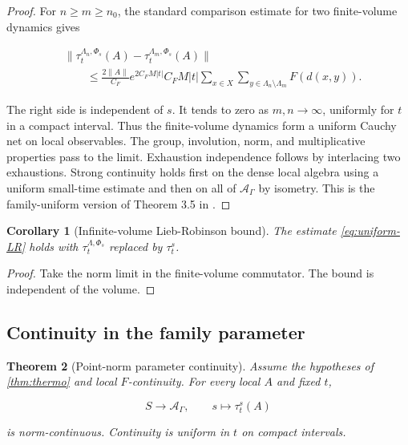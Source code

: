 \documentclass[12pt]{article}
\newtheorem{theorem}{Theorem}[section]
\newtheorem{corollary}[theorem]{Corollary}
\theoremstyle{definition}
\theoremstyle{remark}
\newcommand{\Alg}{\mathcal A}
\begin{document}
\begin{proof}
For $n\ge m\ge n_0$, the standard comparison estimate for two finite-volume
dynamics gives

\begin{equation}
\begin{split}
 &\|\tau_t^{\Lambda_n,\Phi_s}(A)
       -\tau_t^{\Lambda_m,\Phi_s}(A)\| \\
 &\qquad\le
 \frac{2\|A\|}{C_F}
 e^{2C_FM|t|}C_FM|t|
 \sum_{x\in X}
 \sum_{y\in\Lambda_n\setminus\Lambda_m}F(d(x,y)).
 \label{eq:Cauchy-tail}
\end{split}
\end{equation}

The right side is independent of $s$.  It tends to zero as $m,n\to\infty$,
uniformly for $t$ in a compact interval.  Thus the finite-volume dynamics
form a uniform Cauchy net on local observables.  The group, involution, norm,
and multiplicative properties pass to the limit.  Exhaustion independence
follows by interlacing two exhaustions.  Strong continuity holds first on the
dense local algebra using a uniform small-time estimate and then on all of
$\Alg_\Gamma$ by isometry.  This is the family-uniform version of Theorem
3.5 in \cite{NSY2019}.
\end{proof}

\begin{corollary}[Infinite-volume Lieb-Robinson bound]
The estimate \cref{eq:uniform-LR} holds with
$\tau_t^{\Lambda,\Phi_s}$ replaced by $\tau_t^s$.
\end{corollary}

\begin{proof}
Take the norm limit in the finite-volume commutator.  The bound is independent
of the volume.
\end{proof}

\subsection{Continuity in the family parameter}

\begin{theorem}[Point-norm parameter continuity]
\label{thm:param-cont}
Assume the hypotheses of \cref{thm:thermo} and local $F$-continuity.  For
every local $A$ and fixed $t$,

\begin{equation}
  S\longrightarrow\Alg_\Gamma,
  \qquad
  s\longmapsto\tau_t^s(A)
\end{equation}

is norm-continuous.  Continuity is uniform in $t$ on compact intervals.
\end{theorem}
\end{document}
